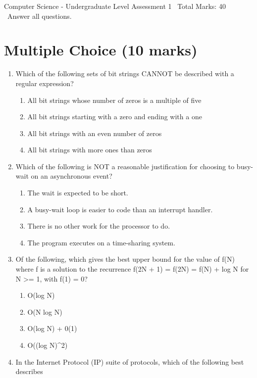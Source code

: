 \documentclass[12pt]{article}
\begin{document}
\begin{center}
Computer Science - Undergraduate Level Assessment 1 \
Total Marks: 40 \
Answer all questions.
\end{center}

\section*{Multiple Choice (10 marks)}
\begin{enumerate}[label=\arabic*.]
\item Which of the following sets of bit strings CANNOT be described with a regular expression?
\begin{enumerate}[label=(\alph*)]
    \item All bit strings whose number of zeros is a multiple of five
    \item All bit strings starting with a zero and ending with a one
    \item All bit strings with an even number of zeros
    \item All bit strings with more ones than zeros
\end{enumerate}
\item Which of the following is NOT a reasonable justification for choosing to busy-wait on an
asynchronous event?
\begin{enumerate}[label=(\alph*)]
    \item The wait is expected to be short.
    \item A busy-wait loop is easier to code than an interrupt handler.
    \item There is no other work for the processor to do.
    \item The program executes on a time-sharing system.
\end{enumerate}
\item Of the following, which gives the best upper bound for the value of f(N) where f is a
solution to the recurrence f(2N + 1) = f(2N) = f(N) + log N for N \textgreater{}= 1, with f(1) = 0?
\begin{enumerate}[label=(\alph*)]
    \item O(log N)
    \item O(N log N)
    \item O(log N) + 0(1)
    \item O((log N)\^{}2)
\end{enumerate}
\item In the Internet Protocol (IP) suite of protocols, which of the following best describes

\end{enumerate}
\end{document}
